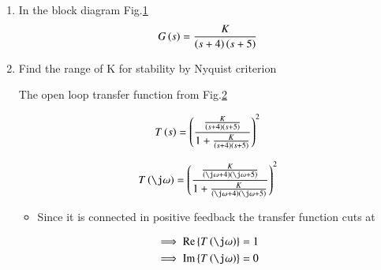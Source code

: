 \begin{enumerate}[label=\thesubsection.\arabic*.,ref=\thesubsection.\theenumi]

\item In the block diagram Fig.\ref{fig:ee18btech11029}  
\begin{align}
G\left(s\right) = \frac{K}{\left(s+4\right)\left(s+5\right)}
\label{ee18btech11034_Gs}
\end{align}
\begin{figure}[!ht]
    \begin{center}
		\resizebox{\columnwidth}{!}{}
	\end{center}
\caption{}
\label{fig:ee18btech11029}
\end{figure}
\item Find the range of K for stability by Nyquist criterion

\solution
\begin{figure}[!h]
    \begin{center}
		\resizebox{\columnwidth}{!}{}
	\end{center}
\caption{}
\label{fig:ee18btech11029_1}
\end{figure}


The open loop transfer function from Fig.\ref{fig:ee18btech11029_1}

\begin{align}
    T\left(s\right) =\left(\frac{\frac{K}{\left(s+4\right)\left(s+5\right)}}{1+\frac{K}{\left(s+4\right)\left(s+5\right)}}\right)^2 
\end{align}


\begin{align}
    T\brak{\j\omega} =\brak{\frac{\frac{K}{\brak{\j\omega+4}\brak{\j\omega+5}}}{1+\frac{K}{\brak{\j\omega+4}\brak{\j\omega+5}}}}^2 
\end{align}




\begin{itemize}
    \item Since it is connected in positive feedback the transfer function cuts at  
\end{itemize}

\begin{align}
    \implies  \text{Re} \cbrak{T\brak{\j\omega}} &= 1\\
      \implies  \text{Im} \cbrak{T\brak{\j \omega}} &= 0
     \label{eq:ee18btech11029_eq_Re}
\end{align}



\end{enumerate}

